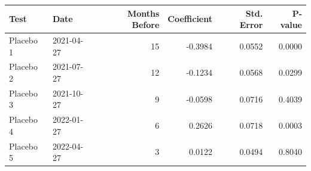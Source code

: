 \begin{tabular}{llrrrr}
\hline
Test & Date & Months Before & Coefficient & Std. Error & P-value \\
\hline
Placebo 1 & 2021-04-27 & 15 & -0.3984 & 0.0552 & 0.0000 \\
Placebo 2 & 2021-07-27 & 12 & -0.1234 & 0.0568 & 0.0299 \\
Placebo 3 & 2021-10-27 & 9 & -0.0598 & 0.0716 & 0.4039 \\
Placebo 4 & 2022-01-27 & 6 & 0.2626 & 0.0718 & 0.0003 \\
Placebo 5 & 2022-04-27 & 3 & 0.0122 & 0.0494 & 0.8040 \\
\hline
\end{tabular}
